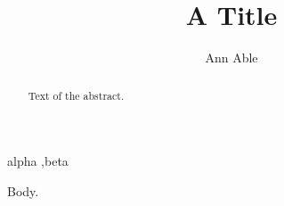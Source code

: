 \documentclass{elsarticle}
\newcommand\hidden[1]{}
\begin{document}
\begin{frontmatter}
\title{A Title}
\author[a]{Ann Able\hidden{Zed Zebra}}
\begin{abstract}
Text of the abstract.
\end{abstract}
\begin{keyword}
alpha \sep beta
\end{keyword}
\end{frontmatter}
Body.
\end{document}
